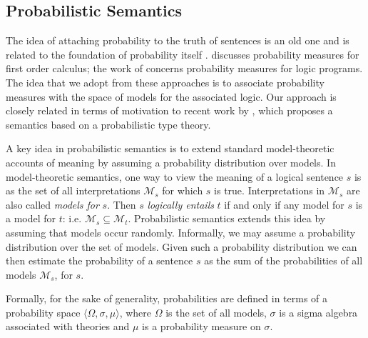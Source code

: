 \documentclass[11pt]{article}
\theoremstyle{definition}
\begin{document}
\subsection{Probabilistic Semantics}
 
The idea of attaching probability to the truth of sentences is an old
one and is related to the foundation of probability itself
\cite{Keynes:21,Los:55}.  discusses probability
measures for first order calculus; the work of 
concerns probability measures for logic programs. The idea that we adopt from these approaches is to associate
probability measures with the space of models for the associated
logic. Our approach is closely related in terms of motivation to recent work by , 
which proposes a semantics based on a probabilistic type theory. 


A key idea in probabilistic semantics is to extend standard
model-theoretic accounts of meaning by assuming a probability
distribution over models.  In model-theoretic semantics, one way to
view the meaning of a logical sentence $s$ is as the set of all
interpretations $\mathcal{M}_s$ for which $s$ is true. Interpretations
in $\mathcal{M}_s$ are also called {\em models for\/} $s$. Then $s$
{\em logically entails\/} $t$ if and only if any model for $s$ is a
model for $t$: i.e. $\mathcal{M}_s \subseteq
\mathcal{M}_t$. Probabilistic semantics extends this idea by assuming
that models occur randomly. Informally, we may assume a probability
distribution over the set of models. Given such a probability
distribution we can then estimate the probability of a sentence $s$ as
the sum of the probabilities of all models $\mathcal{M}_s$, for $s$.

Formally, for the sake of generality, probabilities are defined in
terms of a probability space $\langle \Omega, \sigma, \mu\rangle$,
where $\Omega$ is the set of all models, $\sigma$ is a sigma algebra
associated with theories and $\mu$ is a probability measure on
$\sigma$.



\end{document}
